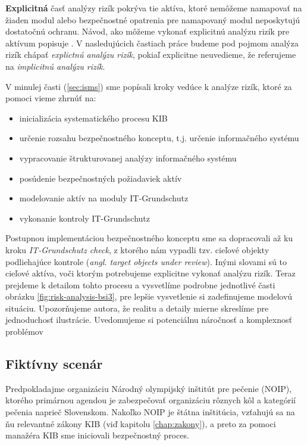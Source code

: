 \textbf{Explicitná} časť analýzy rizík pokrýva tie aktíva, ktoré nemôžeme namapovať na žiaden modul \cite{GSK} alebo bezpečnostné opatrenia pre
namapovaný modul \cite{GSK} neposkytujú dostatočnú ochranu. Návod, ako môžeme vykonať explicitnú analýzu rizík pre aktívum popisuje \cite{BSI3}.
V nasledujúcich častiach práce budeme pod pojmom analýza rizík chápať \emph{explictnú analýzu rizík}, pokiaľ explicitne neuvedieme, že 
referujeme na \emph{implicitnú analýzu rizík}.

V minulej časti (\ref{sec:isms}) sme popísali kroky vedúce k analýze rizík, ktoré za pomoci \cite{BSI2} vieme zhrnúť na:
\begin{itemize}[nosep]
    \item inicializácia systematického procesu KIB
    \item určenie rozsahu bezpečnostného konceptu, t.j. určenie informačného systému
    \item vypracovanie štrukturovanej analýzy informačného systému
    \item posúdenie bezpečnostných požiadaviek aktív
    \item modelovanie aktív na moduly IT-Grundschutz \cite{GSK}
    \item vykonanie kontroly IT-Grundschutz
\end{itemize}

Postupnou implementáciou bezpečnostného konceptu sme sa dopracovali až ku kroku \emph{IT-Grundschutz check}, z ktorého nám vypadli tzv. cieľové objekty
podliehajúce kontrole (\emph{angl. target objects under review}). Inými slovami sú to cieľové aktíva, voči ktorým potrebujeme explicitne vykonať
analýzu rizík. Teraz prejdeme k detailom tohto procesu a vysvetlíme podrobne jednotlivé časti obrázku \ref{fig:risk-analysis-bsi3}, pre lepšie vysvetlenie 
si zadefinujeme modelovú situáciu. Upozorňujeme autora, že realitu a detaily mierne skreslíme pre jednoduchosť ilustrácie. Uvedomujeme si potenciálnu
náročnosť a komplexnosť problémov

\subsection*{Fiktívny scenár}

Predpokladajme organizáciu Národný olympijský inštitút pre pečenie (NOIP), ktorého primárnou agendou je zabezpečovať organizáciu rôznych kôl a kategórií
pečenia naprieč Slovenskom. Nakoľko NOIP je štátna inštitúcia, vzťahujú sa na ňu relevantné zákony KIB (viď kapitolu \ref{chap:zakony}), a preto za pomoci 
manažéra KIB sme iniciovali bezpečnostný proces.

